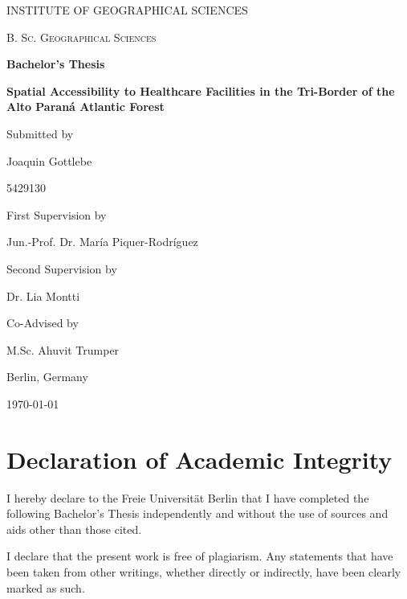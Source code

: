 \documentclass[11pt, a4paper]{report}
\begin{document}
\begin{titlepage}
    \centering
    
    \vspace{1cm}
    
    {\scshape\Large INSTITUTE OF GEOGRAPHICAL SCIENCES\par}
    \vspace{1cm}
    
    {\scshape\Large B. Sc. Geographical Sciences\par}
    \vspace{1cm}
    
    \vfill
    {\huge\bfseries Bachelor's Thesis\par}
    
    {\large\bfseries Spatial Accessibility to Healthcare Facilities in the Tri-Border of the Alto Paraná Atlantic Forest}
    \vfill
    
    {Submitted by\par}
    {\Large Joaquin Gottlebe \par}
    {5429130}
    \vspace{1cm}
    
    {First Supervision by \par}
    {\Large Jun.-Prof. Dr. María Piquer-Rodríguez\par}
    {Second Supervision by \par}
    {\Large Dr. Lia Montti\par}
    {Co-Advised by \par}
    {\Large M.Sc. Ahuvit Trumper \par}
    \vspace{1cm}
    
    {Berlin, Germany\par}
    {\today\par}
    
\end{titlepage}


\chapter*{Declaration of Academic Integrity}

I hereby declare to the Freie Universität Berlin that I have completed the following Bachelor's Thesis independently and without the use of sources and aids other than those cited.

I declare that the present work is free of plagiarism. Any statements that have been taken from other writings, whether directly or indirectly, have been clearly marked as such. 
\end{document}
